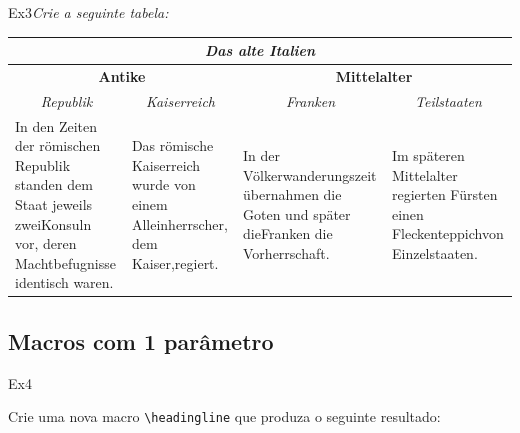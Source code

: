 \begin{texercise}{Ex3}\textit{Crie a seguinte tabela:}\par\smallskip%
\begin{tcboutputlisting}
\begin{tabular}{|p{3cm}|p{3cm}|p{3cm}|p{3cm}|}\hline
\multicolumn{4}{|c|}{\bfseries\itshape Das alte Italien}\\\hline
\multicolumn{2}{|c|}{\bfseries Antike} &
\multicolumn{2}{c|}{\bfseries Mittelalter}\\\hline
\multicolumn{1}{|c|}{\itshape Republik}&
\multicolumn{1}{c|}{\itshape Kaiserreich}&
\multicolumn{1}{c|}{\itshape Franken}&
\multicolumn{1}{c|}{\itshape Teilstaaten}\\\hline
In den Zeiten der r\"{o}mischen Republik standen dem Staat jeweils zweiKonsuln vor, deren Machtbefugnisse identisch waren. &
Das r\"{o}mische Kaiserreich wurde von einem Alleinherrscher, dem Kaiser,regiert.& 
In der V\"{o}lkerwanderungszeit \"{u}bernahmen die Goten und sp\"{a}ter dieFranken die Vorherrschaft.& 
Im sp\"{a}teren Mittelalter regierten F\"{u}rsten einen Fleckenteppichvon Einzelstaaten.\\\hline
\end{tabular}
\end{tcboutputlisting}
\tcbuselistingtext%
\end{texercise}

\subsection*{Macros com 1 parâmetro}
\label{sec:exec_macros_1_par}

\begin{texercise}{Ex4}
    \begin{tcboutputlisting}
        \newcommand{\headingline}[1]{%
            \begin{center}\Large\bfseries #1\end{center}}
        \end{tcboutputlisting}

        \tcbuselistingtext%

Crie uma nova macro \verb+\headingline+ que produza o seguinte resultado:\par\smallskip

    \begin{tcbwritetemp}
    \end{tcbwritetemp}
    \tcbusetemplisting\tcbusetemp%
\end{texercise}

